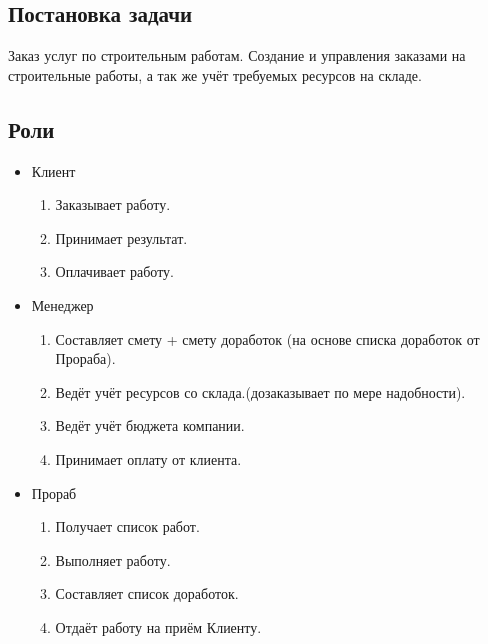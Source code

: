 \documentclass[12pt,a4paper,titlepage]{article}
\begin{document}
\subsection{Постановка задачи}
Заказ услуг по строительным работам.
Создание и управления заказами на строительные работы, а так же учёт требуемых ресурсов на складе.
\subsection{Роли}
\begin{itemize}
\item Клиент
\begin{enumerate}
\item Заказывает работу.
\item Принимает результат.
\item Оплачивает работу.
\end{enumerate}
\item Менеджер
\begin{enumerate}
\item Составляет смету + смету доработок (на основе списка доработок от Прораба).
\item Ведёт учёт ресурсов со склада.(дозаказывает по мере надобности).
\item Ведёт учёт бюджета компании.
\item Принимает оплату от клиента.
\end{enumerate}
\item Прораб
\begin{enumerate}
\item Получает список работ.
\item Выполняет работу.
\item Составляет список доработок.
\item Отдаёт работу на приём Клиенту.
\end{enumerate}
\end{itemize}
\newpage
\end{document}
